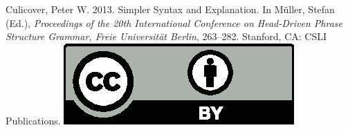 \documentclass[11pt,a4paper,fleqn]{article}
\begin{document}
\noindent



\vfill
\noindent
Culicover, Peter W. 2013. {Simpler Syntax} and Explanation. In Müller, Stefan (Ed.), \emph{{Proceedings of the 20th International Conference on Head-Driven Phrase Structure Grammar, Freie Universit\"{a}t Berlin}}, 263--282. Stanford,
CA: CSLI Publications. \hfill\href{http://creativecommons.org/licenses/by/4.0/}{\includegraphics[height=.75em]{Includes/ccby.eps}}

\newpage

\end{document}
